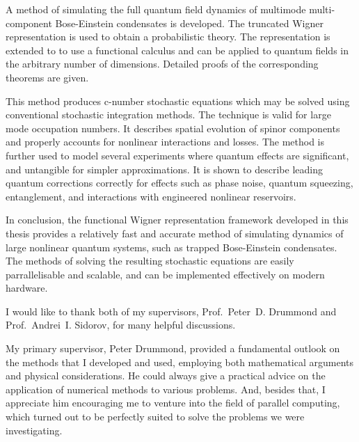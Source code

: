 

\cleardoublepage



A method of simulating the full quantum field dynamics of multimode multi-component Bose-Einstein condensates is developed.
The truncated Wigner representation is used to obtain a probabilistic theory.
The representation is extended to to use a functional calculus and can be applied to quantum fields in the arbitrary number of dimensions.
Detailed proofs of the corresponding theorems are given.

This method produces c-number stochastic equations which may be solved using conventional stochastic integration methods.
The technique is valid for large mode occupation numbers.
It describes spatial evolution of spinor components and properly accounts for nonlinear interactions and losses.
The method is further used to model several experiments where quantum effects are significant, and untangible for simpler approximations.
It is shown to describe leading quantum corrections correctly for effects such as phase noise, quantum squeezing, entanglement, and interactions with engineered nonlinear reservoirs.

In conclusion, the functional Wigner representation framework developed in this thesis provides a relatively fast and accurate method of simulating dynamics of large nonlinear quantum systems, such as trapped Bose-Einstein condensates.
The methods of solving the resulting stochastic equations are easily parrallelisable and scalable, and can be implemented effectively on modern hardware.


\cleardoublepage


I would like to thank both of my supervisors, Prof.~Peter~D. Drummond and Prof.~Andrei~I. Sidorov, for many helpful discussions.

My primary supervisor, Peter Drummond, provided a fundamental outlook on the methods that I developed and used, employing both mathematical arguments and physical considerations.
He could always give a practical advice on the application of numerical methods to various problems.
And, besides that, I appreciate him encouraging me to venture into the field of parallel computing, which turned out to be perfectly suited to solve the problems we were investigating.

